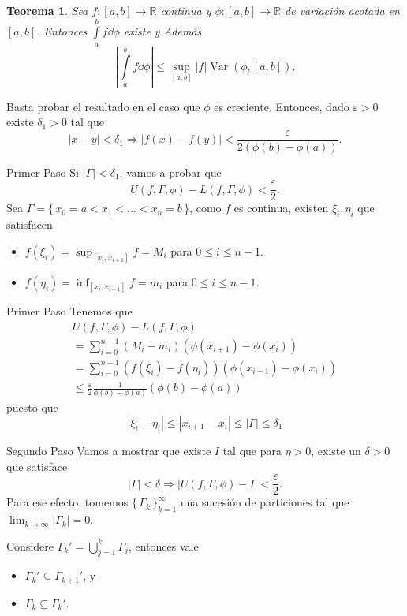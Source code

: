 \documentclass[utf8]{beamer}
\theoremstyle{plain}
\newtheorem{Th}{Teorema}               %
\theoremstyle{definition}
\theoremstyle{remark}
\numberwithin{equation}{section}
\newcommand{\dl}{\delta}                %
\newcommand{\eps}{\varepsilon}          %
\newcommand{\Ga}{\Gamma}                %
\newcommand{\bR}{\mathbb{R}}    %
\newcommand{\set}[1]{\{\,#1\,\}}    %
\renewcommand{\leq}{\leqslant}          %
\newcommand{\To}{\Rightarrow}
\newcommand{\suck}{_{k=1}^\infty} %
\renewcommand{\.}{\Cdot}                %
\DeclareMathOperator{\Var}{Var}     %
\begin{document}
 \begin{frame}
   \begin{Th}
Sea $f:[a,b]\to\bR$ continua y $\phi:[a,b]\to\bR$ de variación acotada en $[a,b]$. Entonces $\int\limits_a^bf\dd\phi$ existe y Además
$$\left|\int\limits_a^bf\dd\phi\right|\leq\sup_{[a,b]}|f|\Var(\phi,[a,b]).$$
   \end{Th}
   Basta probar el resultado en el caso que $\phi$ es creciente. Entonces, dado $\eps>0$ existe $\dl_1>0$ tal que
   $$|x-y|<\dl_1\To |f(x)-f(y)|<\frac{\eps}{2(\phi(b)-\phi(a))}.$$
 \end{frame}

 \begin{frame}{Primer Paso}
   Si $|\Ga|<\dl_1$, vamos a probar que 
   $$U(f,\Ga,\phi)-L(f,\Ga,\phi)<\frac\eps 2.$$
   Sea $\Ga=\set{x_0=a<x_1<\dots<x_n=b}$, como $f$ es continua, existen $\xi_i,\eta_i$ que satisfacen 
   \begin{itemize}
    \item $f(\xi_i)=\sup_{[x_i,x_{i+1}]}f=M_i$ para $0\leq i\leq n-1$.
    \item $f(\eta_i)=\inf_{[x_i,x_{i+1}]}f=m_i$ para $0\leq i\leq n-1$.
   \end{itemize}
 \end{frame}

 \begin{frame}{Primer Paso}
   Tenemos que 
   \begin{gather*}
     U(f,\Ga,\phi)-L(f,\Ga,\phi)\\
     =\sum_{i=0}^{n-1}(M_i-m_i)(\phi(x_{i+1})-\phi(x_i))\\
     =\sum_{i=0}^{n-1}(f(\xi_i)-f(\eta_i))(\phi(x_{i+1})-\phi(x_i))\\
     \leq \frac{\eps}{2}\frac{1}{\phi(b)-\phi(a)}(\phi(b)-\phi(a))
   \end{gather*}
   puesto que 
   $$|\xi_i-\eta_i|\leq |x_{i+1}-x_i|\leq |\Ga|\leq \dl_1$$
 \end{frame}

 \begin{frame}{Segundo Paso}
  Vamos a mostrar que existe $I$ tal que para $\eta>0$, existe un $\dl>0$ que satisface
  $$|\Ga|<\dl\To |U(f,\Ga,\phi)-I|<\frac\eps 2.$$
  Para ese efecto, tomemos $\set{\Ga_k}\suck$ una sucesión de particiones tal que $\lim_{k\to\infty}|\Ga_k|=0$.\par 
  Considere $\Ga_k'=\bigcup_{j=1}^k\Ga_j$, entonces vale
  \begin{itemize}
    \item $\Ga_k'\subseteq\Ga_{k+1}'$, y
    \item $\Ga_k\subseteq\Ga_k'$.
  \end{itemize}  
   \end{frame}
\end{document}
